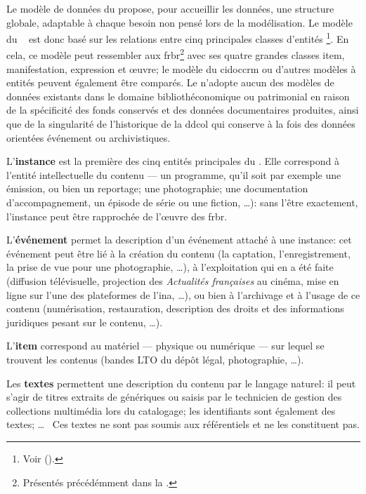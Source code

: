 Le modèle de données du \ldd propose, pour accueillir les données, une structure globale, adaptable à chaque besoin non pensé lors de la modélisation. Le modèle du \ldd~ est donc basé sur les relations entre cinq principales classes d'entités \footnote{Voir  ().}. En cela, ce modèle peut ressembler aux \ac{frbr}\footnote{Présentés précédémment dans la .} avec ses quatre grandes classes item, manifestation, expression et œuvre; le modèle du \ac{cidoccrm} ou d'autres modèles à entités peuvent également être comparés. Le \ldd n'adopte aucun des modèles de données existants dans le domaine bibliothéconomique ou patrimonial en raison de la spécificité des fonds conservés et des données documentaires produites, ainsi que de la singularité de l'historique de la \ac{ddcol} qui conserve à la fois des données orientées événement ou archivistiques.


\noindent L'\textbf{instance} est la première des cinq entités principales du \ldd. Elle correspond à l'entité intellectuelle du contenu --- un programme, qu'il soit par exemple une émission, ou bien un reportage; une photographie; une documentation d'accompagnement, un épisode de série ou une fiction, \dots): sans l'être exactement, l'instance peut être rapprochée de l'œuvre des \ac{frbr}.


\noindent L'\textbf{événement} permet la description d'un événement attaché à une instance: cet événement peut être lié à la création du contenu (la captation, l'enregistrement, la prise de vue pour une photographie, \dots), à l'exploitation qui en a été faite (diffusion télévisuelle, projection des \textit{Actualités françaises} au cinéma, mise en ligne sur l'une des plateformes de l'\ac{ina}, \dots), ou bien à l'archivage et à l'usage de ce contenu (numérisation, restauration, description des droits et des informations juridiques pesant sur le contenu, \dots).

\noindent L'\textbf{item} correspond au matériel --- physique ou numérique --- sur lequel se trouvent les contenus (bandes LTO du dépôt légal, photographie, \dots).

\noindent Les \textbf{textes} permettent une description du contenu par le langage naturel: il peut s'agir de titres extraits de génériques ou saisis par le technicien de gestion des collections multimédia lors du catalogage; les identifiants sont également des textes; \dots ~ Ces textes ne sont pas soumis aux référentiels et ne les constituent pas.

